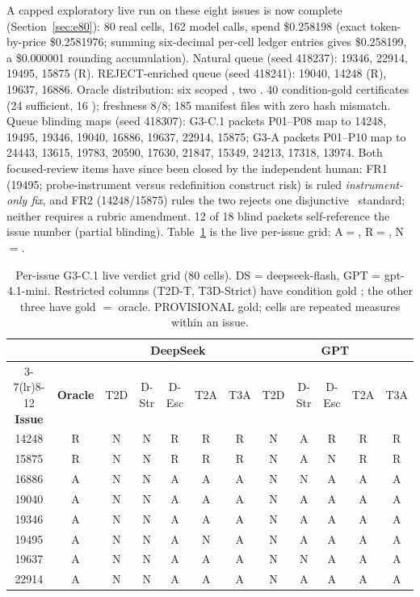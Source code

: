 A capped exploratory live run on these eight issues is now complete
(Section~\ref{sec:e80}): 80 real cells, 162 model calls, spend \$0.258198
(exact token-by-price \$0.2581976; summing six-decimal per-cell ledger
entries gives \$0.258199, a \$0.000001 rounding accumulation).
Natural queue (seed 418237): 19346, 22914, 19495, 15875 (R). REJECT-enriched
queue (seed 418241): 19040, 14248 (R), 19637, 16886. Oracle distribution: six
scoped \ACCEPT, two \REJECT. 40 condition-gold certificates (24 sufficient,
16 \NEED); freshness $8/8$; 185 manifest files with zero hash mismatch. Queue
blinding maps (seed 418307): G3-C.1 packets P01--P08 map to 14248, 19495,
19346, 19040, 16886, 19637, 22914, 15875; G3-A packets P01--P10 map to 24443,
13615, 19783, 20590, 17630, 21847, 15349, 24213, 17318, 13974. Both focused-review items have since been closed by the independent human:
FR1 (19495; probe-instrument versus redefinition construct risk) is ruled
\emph{instrument-only fix}, and FR2 (14248/15875) rules the two rejects
one disjunctive \REJECT\ standard; neither requires a rubric
amendment. 12 of 18 blind packets self-reference the issue number (partial
blinding). Table~\ref{tab:t2} is the live per-issue grid; A$=$\ACCEPT,
R$=$\REJECT, N$=$\NEED.

\begin{table}[h]
\centering
\scriptsize
\setlength{\tabcolsep}{3.2pt}
\caption{Per-issue G3-C.1 live verdict grid (80 cells). DS =
deepseek-flash, GPT = gpt-4.1-mini. Restricted columns (T2D-T, T3D-Strict)
have condition gold \NEED; the other three have gold $=$ oracle. PROVISIONAL
gold; cells are repeated measures within an issue.}
\label{tab:t2}
\begin{tabular}{c c ccccc ccccc}
\toprule
 & & \multicolumn{5}{c}{\textbf{DeepSeek}} & \multicolumn{5}{c}{\textbf{GPT}} \\
\cmidrule(lr){3-7}\cmidrule(lr){8-12}
\textbf{Issue} & \textbf{Oracle} & T2D & D-Str & D-Esc & T2A & T3A & T2D & D-Str & D-Esc & T2A & T3A \\
\midrule
14248 & R & N & N & R & R & R & N & A & R & R & R \\
15875 & R & N & N & R & R & R & N & A & N & R & R \\
16886 & A & N & N & A & A & A & N & N & A & A & A \\
19040 & A & N & N & A & A & A & N & A & A & A & A \\
19346 & A & N & N & A & A & A & N & A & A & A & A \\
19495 & A & N & N & A & N & A & N & A & A & A & A \\
19637 & A & N & N & A & A & A & N & N & A & A & A \\
22914 & A & N & N & A & A & A & N & A & A & A & A \\
\bottomrule
\end{tabular}
\end{table}

